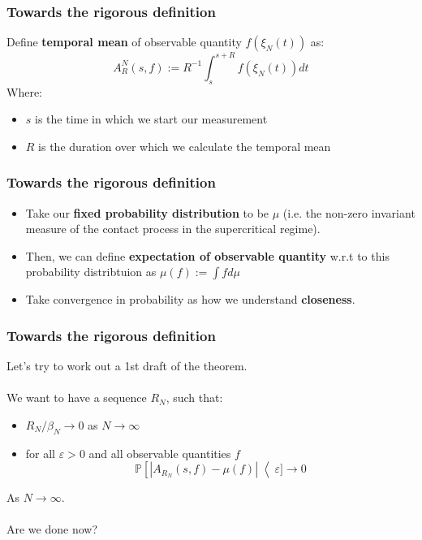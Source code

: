 \documentclass{beamer}
\begin{document}
\begin{frame}
    \frametitle{Towards the rigorous definition}

    Define \textbf{temporal mean} of observable quantity $f(\xi_N(t))$ as:
    \[
        A^N_R(s, f) := R^{-1}\int_s^{s+R}f(\xi_N(t))dt
    \]
    Where:
    \begin{itemize}
        \item $s$ is the time in which we start our measurement
        \item $R$ is the duration over which we calculate the temporal mean
    \end{itemize}
\end{frame}

\begin{frame}
    \frametitle{Towards the rigorous definition}
    \begin{itemize}
        \item Take our \textbf{fixed probability distribution} to be $\mu$ (i.e. the non-zero invariant measure of the contact process in the supercritical regime).
        \item Then, we can define \textbf{expectation of observable quantity} w.r.t to this probability distribtuion as $\mu(f) := \int fd\mu$ 
        \item Take convergence in probability as how we understand \textbf{closeness}.
    \end{itemize}
\end{frame}

\begin{frame}
    \frametitle{Towards the rigorous definition}
    Let's try to work out a 1st draft of the theorem. \\~\\
    We want to have a sequence $R_N$, such that:
    \begin{itemize}
        \item $R_N / \beta_N \rightarrow 0$ as $N \rightarrow \infty$
        \item for all $\varepsilon > 0$ and all observable quantities $f$
        \[
            \mathbb{P}\left[ |A_{R_N}(s, f) - \mu(f)|\right < \varepsilon] \rightarrow 0
        \]
    \end{itemize}

    As $N \rightarrow \infty$. \\~\\
    Are we done now?
\end{frame}
\end{document}
